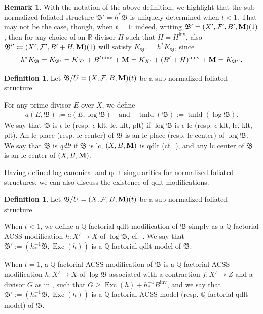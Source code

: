 \documentclass[11pt,reqno]{amsart}
\numberwithin{equation}{section}
\newcommand{\Mm}{{\bf{M}}}
\newcommand{\Exc}{\operatorname{Exc}}
\newcommand{\ninv}{\operatorname{ninv}}
\newcommand{\inv}{\operatorname{inv}}
\newcommand{\tmld}{{\operatorname{tmld}}}
\newcommand{\Bb}{{\mathfrak{B}}}
\newcommand{\Ff}{\mathcal{F}}
\theoremstyle{definition}
\newtheorem{defn}[thm]{Definition}
\newtheorem{rem}[thm]{Remark}
\begin{document}
\begin{rem}
With the notation of the above definition, we highlight that the sub-normalized foliated structure $\Bb'= h^\ast \Bb$ is uniquely determined when $t<1$.
That may not be the case, though, when $t=1$:
indeed, writing $\Bb' = (X',\Ff',B',\Mm)(1)$, then for any choice of an $\mathbb R$-divisor $H$ such that $H=H^{\inv}$, also $\Bb'' \coloneqq (X',\Ff',B'+H,\Mm)(1)$ will satisfy $K_{\Bb''}=h^\ast K_{\Bb}$, since 
\[
h^\ast K_{\Bb}=K_{\Bb'}=K_{X'}+B'^{\ninv}+\Mm=K_{X'}+(B'+H)^{\ninv}+\Mm= K_{\Bb''}.
\]
\end{rem}

\begin{defn}\label{defn: sing of nfs}
Let $\Bb/U=(X,\Ff,B,\Mm)(t)$ be a sub-normalized foliated structure. 

For any prime divisor $E$ over $X$, we define 
\begin{align*}
a(E,\Bb):=a(E,\log\Bb)
\quad \text{and} \quad
\tmld(\Bb):=\tmld(\log\Bb).
\end{align*}
We say that $\Bb$ is $\epsilon$-lc (resp. $\epsilon$-klt, lc, klt, plt) if $\log\Bb$ is $\epsilon$-lc (resp. $\epsilon$-klt, lc, klt, plt). An lc place (resp. lc center) of $\Bb$ is an lc place (resp. lc center) of $\log\Bb$. We say that $\Bb$ is \emph{qdlt} if $\Bb$ is lc, $(X,B,\Mm)$ is qdlt (cf.~\cite[Definition~7.1.1]{CHLX23}), and any lc center of $\Bb$ is an lc center of $(X,B,\Mm)$. 
\end{defn}

Having defined log canonical and qdlt singularities for normalized foliated structures, we can also discuss the existence of qdlt modifications.

\begin{defn}
Let $\Bb/U=(X,\Ff,B,\Mm)(t)$ be a sub-normalized foliated structure. 

When $t<1$, we define a $\mathbb Q$-factorial qdlt modification of $\Bb$ simply as a $\mathbb Q$-factorial ACSS modification $h\colon X'\rightarrow X$ of $\log\Bb$, cf.~\cite[Definition~3.7]{Cas+24}.
We say that $\Bb':=(h^{-1}_*\Bb,\Exc(h))$ is a $\mathbb Q$-factorial qdlt model of $\Bb$. 

When $t=1$, a $\mathbb Q$-factorial ACSS modification of $\Bb$ is a $\mathbb Q$-factorial ACSS modification $h\colon X'\rightarrow X$ of $\log\Bb$ associated with a contraction $f: X'\rightarrow Z$ and a divisor $G$ as in \cite[Definition~2.18]{Cas+24}, such that $G\geq\Exc(h)+h^{-1}_*B^{\inv}$, and we say that $\Bb':=(h^{-1}_*\Bb,\Exc(h))$ is a $\mathbb Q$-factorial ACSS model (resp. $\mathbb Q$-factorial qdlt model) of $\Bb$. 
\end{defn}
\end{document}
